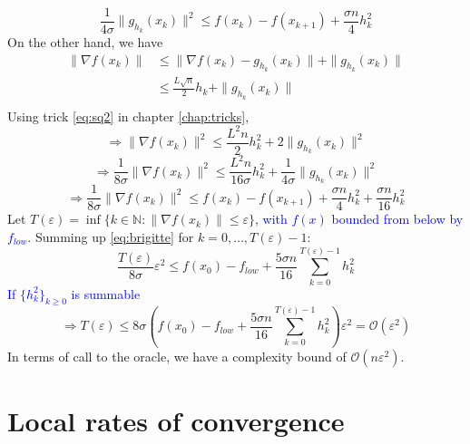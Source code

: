 \documentclass[12pt, openany]{report}
\renewcommand{\O}{\mathcal{O}}
\theoremstyle{definition}
\begin{document}
\begin{equation}
	\frac{1}{4\sigma} \|g_{h_k}(x_k)\|^2 \leq f(x_k) - f(x_{k+1}) + \frac{\sigma n}{4} h_k^2
\end{equation}
On the other hand, we have
\begin{equation}
	\begin{aligned}
		\|\nabla f(x_k)\| &\leq \|\nabla f(x_k) - g_{h_k}(x_k)\| + \|g_{h_k}(x_k)\|\\
		&\leq \frac{L \sqrt{n}}{2} h_k + \|g_{h_k}(x_k)\|\\
	\end{aligned}
\end{equation}
Using trick \eqref{eq:sq2} in chapter \ref{chap:tricks},
\begin{equation}
	\Longrightarrow \|\nabla f(x_k)\|^2 \leq \frac{L^2 n}{2} h_k^2 + 2 \|g_{h_k}(x_k)\|^2 
\end{equation}
\begin{equation}
	\Longrightarrow \frac{1}{8 \sigma} \|\nabla f(x_k)\|^2 \leq \frac{L^2n}{16\sigma} h_k^2 + \frac{1}{4\sigma} \|g_{h_k}(x_k)\|^2
\end{equation}
\begin{equation}\label{eq:brigitte}
	\Longrightarrow \frac{1}{8 \sigma} \|\nabla f(x_k)\|^2 \leq f(x_k) - f(x_{k+1}) + \frac{\sigma n}{4} h_k^2 + \frac{\sigma n}{16}h_k^2
\end{equation}
Let $T(\varepsilon) = \inf \{k\in \mathbb{N}: \|\nabla f(x_k)\| \leq \varepsilon \}$, \textcolor{blue}{with $f(x)$ bounded from below by $f_{low}$}. Summing up \eqref{eq:brigitte} for $k=0,\dots, T(\varepsilon)-1$:
\begin{equation}
	\frac{T(\varepsilon)}{8 \sigma} \varepsilon^2 \leq f(x_0) - f_{low} + \frac{5 \sigma n}{16} \sum_{k=0}^{T(\varepsilon)-1} h_k^2
\end{equation}
\textcolor{blue}{If $\{h_k^2\}_{k\ge0}$ is summable}
\begin{equation}
	\Longrightarrow T(\varepsilon) \leq 8 \sigma \left( f(x_0) - f_{low} + \frac{5 \sigma n}{16} \sum_{k=0}^{T(\varepsilon)-1} h_k^2\right) \varepsilon^2 = \O(\varepsilon^2)
\end{equation}
In terms of call to the oracle, we have a complexity bound of $\O(n\varepsilon^2)$.

\chapter{Local rates of convergence}
\end{document}
